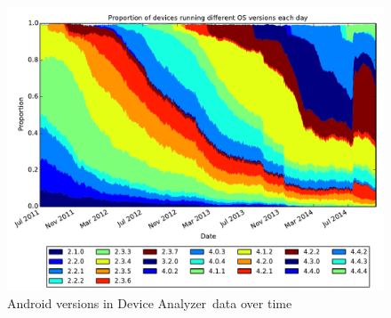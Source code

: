\documentclass[conference,a4paper,twoside]{IEEEtran}
\newcommand{\da}{Device Analyzer}
\begin{document}
\begin{figure}
 \centering
 \includegraphics[width=\columnwidth]{figures/da_norm_os}
 \caption{Android versions in \da\ data over time}
 \label{fig:norm_os}
\end{figure}
\end{document}
